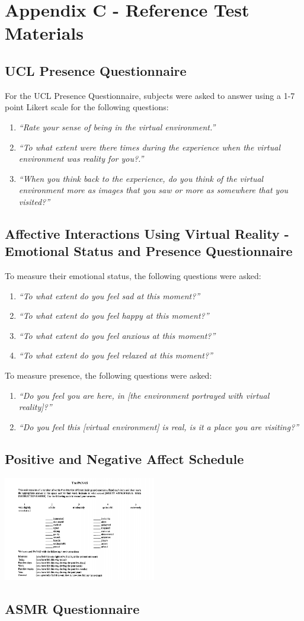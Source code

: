 \documentclass{sigchi}
\newcommand{\inlinequote}[1]{\textit{``#1''}}
\begin{document}
\section{Appendix C - Reference Test Materials}
\label{appendix:test_materials}
\subsection{UCL Presence Questionnaire}
For the UCL Presence Questionnaire, subjects were asked to answer using a 1-7 point Likert scale for the following questions:
\begin{enumerate}
	\item{\inlinequote{Rate your sense of being in the virtual environment.}}
	\item{\inlinequote{To what extent were there times during the experience when the virtual environment was reality for you?.}}
	\item{\inlinequote{When you think back to the experience, do you think of the virtual environment more as images that you saw or more	as somewhere that you visited?}}
	\end{enumerate}

\subsection{Affective Interactions Using Virtual Reality - Emotional Status and Presence Questionnaire}
To measure their emotional status, the following questions were asked:
\begin{enumerate}
	\item{\inlinequote{To what extent do you feel sad at this moment?}}
	\item{\inlinequote{To what extent do you feel happy at this	moment?}}
	\item{\inlinequote{To what extent do you feel anxious at this moment?}}
	\item{\inlinequote{To what extent do you feel relaxed at this moment?}}
\end{enumerate}

To measure presence, the following questions were asked:
\begin{enumerate}
	\item{\inlinequote{Do you feel you are here, in [the environment portrayed with virtual reality]?}}
	\item{\inlinequote{Do you feel this [virtual environment] is real, is it a place you are visiting?}}
\end{enumerate}

\subsection{Positive and Negative Affect Schedule}
\includegraphics[width=0.5\textwidth]{questionnaires/ThePANAS.png}

\subsection{ASMR Questionnaire}

\end{document}
